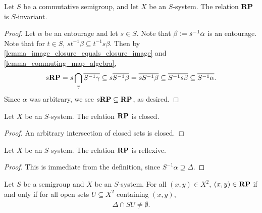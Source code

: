 \begin{lemma}
    \label{lemma_frp_basics_invariant}
    \leanok{}
    Let $S$ be a commutative semigroup, and let $X$ be an $S$-system.  The relation $\mathbf{RP}$ is $S$-invariant.
\end{lemma}

\begin{proof}
\leanok{}
    Let $\alpha$ be an entourage and let $s \in S$.  Note that $\beta \vcentcolon= s^{-1} \alpha$ is an entourage.  Note that for $t \in S$, $st^{-1} \beta \subseteq t^{-1} s \beta$. Then by \cref{lemma_image_closure_equals_closure_image} and \cref{lemma_commuting_map_algebra},
    \[s \mathbf{RP} = s \bigcap_{\gamma} \overline{S^{-1}\gamma} \subseteq s \overline{S^{-1} \beta} = \overline{sS^{-1} \beta} \subseteq \overline{S^{-1} s \beta} \subseteq \overline{S^{-1} \alpha}.\]
    Since $\alpha$ was arbitrary, we see $s \mathbf{RP} \subseteq \mathbf{RP}$, as desired.
\end{proof}

\begin{lemma}
\label{lemma_frp_basics_closed}
\leanok{}
    Let $X$ be an $S$-system.  The relation $\mathbf{RP}$ is closed.
\end{lemma}

\begin{proof}
\leanok{}
    An arbitrary intersection of closed sets is closed. 
\end{proof}

\begin{lemma}
\label{lemma_frp_reflexive}
\leanok{}
    Let $X$ be an $S$-system.  The relation $\mathbf{RP}$ is reflexive.
\end{lemma}

\begin{proof}
\leanok{}
    This is immediate from the definition, since $S^{-1} \alpha \supseteq \Delta.$
\end{proof}

\begin{lemma}
\label{lemma_frp_iff_nbhd_tran_int_hits_diagonal}
\leanok{}
    Let $S$ be a semigroup and $X$ be an $S$-system.  For all $(x,y) \in X^2$, $(x,y) \in \mathbf{RP}$ if and only if for all open sets $U \subseteq X^2$ containing $(x,y)$,
    \begin{align}
    \label{eqn_in_rp_equiv_set_v2}
         \Delta \cap \overline{S U} \neq \emptyset.
    \end{align}
\end{lemma}

